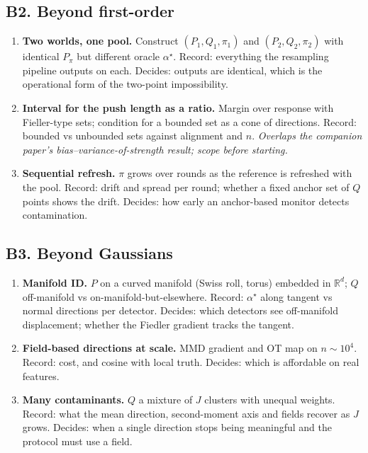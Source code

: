 \documentclass[10pt]{article}
\newcommand{\hd}[1]{\textbf{#1}}
\begin{document}
\subsection*{B2. Beyond first-order}
\begin{enumerate}[leftmargin=*,itemsep=2pt]
\item \hd{Two worlds, one pool.} Construct $(P_1,Q_1,\pi_1)$ and $(P_2,Q_2,\pi_2)$ with identical $P_\pi$ but different oracle $\alpha^\star$. Record: everything the resampling pipeline outputs on each. Decides: outputs are identical, which is the operational form of the two-point impossibility.
\item \hd{Interval for the push length as a ratio.} Margin over response with Fieller-type sets; condition for a bounded set as a cone of directions. Record: bounded vs unbounded sets against alignment and $n$. \emph{Overlaps the companion paper's bias--variance-of-strength result; scope before starting.}
\item \hd{Sequential refresh.} $\pi$ grows over rounds as the reference is refreshed with the pool. Record: drift and spread per round; whether a fixed anchor set of $Q$ points shows the drift. Decides: how early an anchor-based monitor detects contamination.
\end{enumerate}

\subsection*{B3. Beyond Gaussians}
\begin{enumerate}[leftmargin=*,itemsep=2pt]
\item \hd{Manifold ID.} $P$ on a curved manifold (Swiss roll, torus) embedded in $\mathbb R^d$; $Q$ off-manifold vs on-manifold-but-elsewhere. Record: $\alpha^\star$ along tangent vs normal directions per detector. Decides: which detectors see off-manifold displacement; whether the Fiedler gradient tracks the tangent.
\item \hd{Field-based directions at scale.} MMD gradient and OT map on $n\sim10^4$. Record: cost, and cosine with local truth. Decides: which is affordable on real features.
\item \hd{Many contaminants.} $Q$ a mixture of $J$ clusters with unequal weights. Record: what the mean direction, second-moment axis and fields recover as $J$ grows. Decides: when a single direction stops being meaningful and the protocol must use a field.
\end{enumerate}
\end{document}
